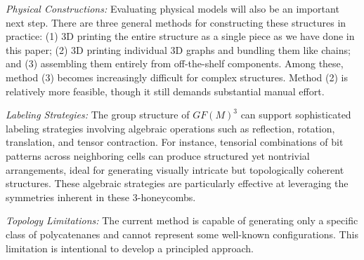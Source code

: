 \documentclass[times,twocolumn,final]{elsarticle}
\begin{document}
\textit{Physical Constructions:} Evaluating physical models will also be an important next step. There are three general methods for constructing these structures in practice: (1) 3D printing the entire structure as a single piece as we have done in this paper; (2) 3D printing individual 3D graphs and bundling them like chains; and (3) assembling them entirely from off-the-shelf components. Among these, method (3) becomes increasingly difficult for complex structures. Method (2) is relatively more feasible, though it still demands substantial manual effort.

\textit{Labeling Strategies:} The group structure of $GF(M)^3$ can support sophisticated labeling strategies involving algebraic operations such as reflection, rotation, translation, and tensor contraction. For instance, tensorial combinations of bit patterns across neighboring cells can produce structured yet nontrivial arrangements, ideal for generating visually intricate but topologically coherent structures. These algebraic strategies are particularly effective at leveraging the symmetries inherent in these 3-honeycombs.

\textit{Topology Limitations:} The current method is capable of generating only a specific class of polycatenanes and cannot represent some well-known configurations. This limitation is intentional to develop a principled approach. 




\end{document}
